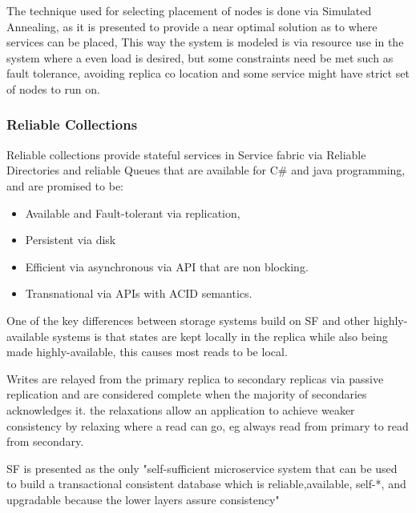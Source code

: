 \documentclass[a4paper,10pt,titlepage]{report}
\begin{document}
The technique used for selecting placement of nodes is done via Simulated Annealing, as it is presented to provide a near optimal solution as to where services can be placed, This way the system is modeled is via resource use in the system where a even load is desired, but some constraints need be met such as fault tolerance, avoiding replica co location and some service might have strict set of nodes to run on. \\
\vspace{5mm}


\subsubsection{Reliable Collections}

Reliable collections provide stateful services in Service fabric via Reliable Directories and reliable Queues that are available for C\# and java programming, and are promised to be:
\begin{itemize}
    \item Available and Fault-tolerant via replication,
    \item Persistent via disk
    \item Efficient via asynchronous via API that are non blocking. 
    \item Transnational via APIs with ACID semantics.
\end{itemize}

One of the key differences between storage systems build on SF and other highly-available systems is that states are kept locally in the replica while also being made highly-available, this causes most reads to be local.\\
\vspace{5mm}

Writes are relayed from the primary replica to secondary replicas via passive replication and are considered complete when the majority of secondaries acknowledges it. the relaxations allow an application to achieve weaker consistency by relaxing where a read can go, eg always read from primary to read from secondary. \\
\vspace{5mm}

SF is presented as the only "self-sufficient microservice system that can be used to build a transactional consistent database which is reliable,available, self-*, and upgradable because the lower layers assure consistency"\cite{SFpaper} \\
\vspace{5mm}
\end{document}
